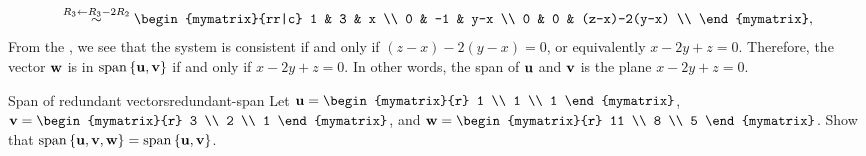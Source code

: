 \begin{solution}
\begin{equation*}
    \stackrel{R_3\leftarrow R_3-2R_2}{\sim}
    \begin{mymatrix}{rr|c}
      1 & 3 & x \\
      0 & -1 & y-x \\
      0 & 0 & (z-x)-2(y-x) \\
    \end{mymatrix},
  \end{equation*}
  From the {\ef}, we see that the system is consistent if and only if
  $(z-x)-2(y-x)=0$, or equivalently $x - 2y + z = 0$. Therefore, the
  vector $\mbox{\bf w}$ is in $\sspan\set{\vect{u},\vect{v}}$ if and only
  if $x - 2y + z = 0$. In other words, the span of $\mbox{\bf u}$ and
  $\mbox{\bf v}$ is the plane $x - 2y + z = 0$.
\end{solution}

\begin{example}{Span of redundant vectors}{redundant-span}
  Let $\vect{u}=\begin{mymatrix}{r} 1 \\ 1 \\ 1 \end{mymatrix}$,
  $\vect{v}=\begin{mymatrix}{r} 3 \\ 2 \\ 1 \end{mymatrix}$, and
  $\vect{w}=\begin{mymatrix}{r} 11 \\ 8 \\ 5 \end{mymatrix}$.
  Show that
  $\sspan\set{\vect{u},\vect{v},\vect{w}} =
  \sspan\set{\vect{u},\vect{v}}$.
\end{example}

